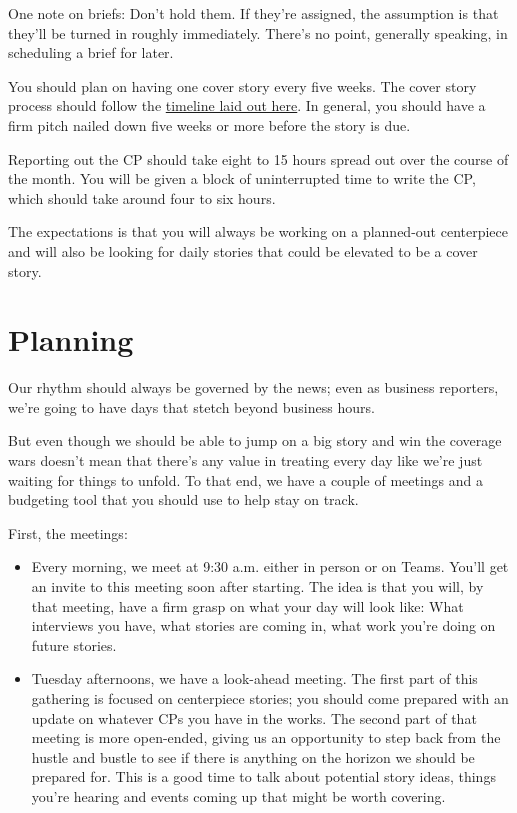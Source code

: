 \documentclass[
  12pt,
  american,
  letterpaperpaper,
  extrafontsizes,onecolumn,openright
  ]{memoir}
\providecommand{\tightlist}{%
  \setlength{\itemsep}{0pt}\setlength{\parskip}{0pt}}
\begin{document}
One note on briefs: Don't hold them. If they're assigned, the assumption is that they'll be turned in roughly immediately. There's no point, generally speaking, in scheduling a brief for later.

You should plan on having one cover story every five weeks. The cover story process should follow the \href{https://docs.google.com/spreadsheets/d/1NA5khaUA2TEatah0DSByH2hUVMbGpzMzeFEqfeBC0-Q/edit\#gid=1493329012}{timeline laid out here}. In general, you should have a firm pitch nailed down five weeks or more before the story is due.~

Reporting out the CP should take eight to 15 hours spread out over the course of the month. You will be given a block of uninterrupted time to write the CP, which should take around four to six hours.

The expectations is that you will always be working on a planned-out centerpiece and will also be looking for daily stories that could be elevated to be a cover story.

\hypertarget{planning}{%
\section*{Planning}\label{planning}}

Our rhythm should always be governed by the news; even as business reporters, we're going to have days that stetch beyond business hours.

But even though we should be able to jump on a big story and win the coverage wars doesn't mean that there's any value in treating every day like we're just waiting for things to unfold. To that end, we have a couple of meetings and a budgeting tool that you should use to help stay on track.

First, the meetings:

\begin{itemize}
\tightlist
\item
  Every morning, we meet at 9:30 a.m. either in person or on Teams. You'll get an invite to this meeting soon after starting. The idea is that you will, by that meeting, have a firm grasp on what your day will look like: What interviews you have, what stories are coming in, what work you're doing on future stories.
\item
  Tuesday afternoons, we have a look-ahead meeting. The first part of this gathering is focused on centerpiece stories; you should come prepared with an update on whatever CPs you have in the works. The second part of that meeting is more open-ended, giving us an opportunity to step back from the hustle and bustle to see if there is anything on the horizon we should be prepared for. This is a good time to talk about potential story ideas, things you're hearing and events coming up that might be worth covering.
\end{itemize}
\end{document}
